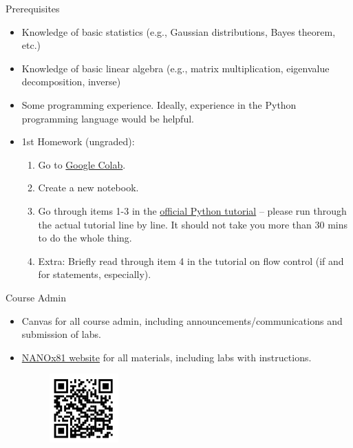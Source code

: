 \documentclass[aspectratio=169]{beamer}
\begin{document}
\begin{frame}{Prerequisites}
    \begin{itemize}
        \item Knowledge of basic statistics (e.g., Gaussian distributions, Bayes theorem, etc.)
        \item Knowledge of basic linear algebra (e.g., matrix multiplication, eigenvalue decomposition, inverse)
        \item Some programming experience. Ideally, experience in the Python programming language would be helpful.
        \item 1st Homework (ungraded):
        \begin{enumerate}
            \item Go to \href{https://colab.research.google.com/}{Google Colab}.
            \item Create a new notebook.
            \item Go through items 1-3 in the \href{http://docs.python.org/3/tutorial/}{official Python tutorial} – please run through the actual tutorial line by line. It should not take you more than 30 mins to do the whole thing.
            \item Extra: Briefly read through item 4 in the tutorial on flow control (if and for statements, especially).
        \end{enumerate}
    \end{itemize}
\end{frame}

\begin{frame}{Course Admin}
    \begin{itemize}
        \item Canvas for all course admin, including announcements/communications and submission of labs.
        \item \href{https://materialsvirtuallab.github.io/nano281/}{NANOx81 website} for all materials, including labs with instructions.
        \begin{figure}
            \centering
            \includegraphics[width=0.25\textwidth]{figures/QR-NANO281Github.png}
            \label{fig:my_label}
        \end{figure}
    \end{itemize}
\end{frame}
\end{document}
